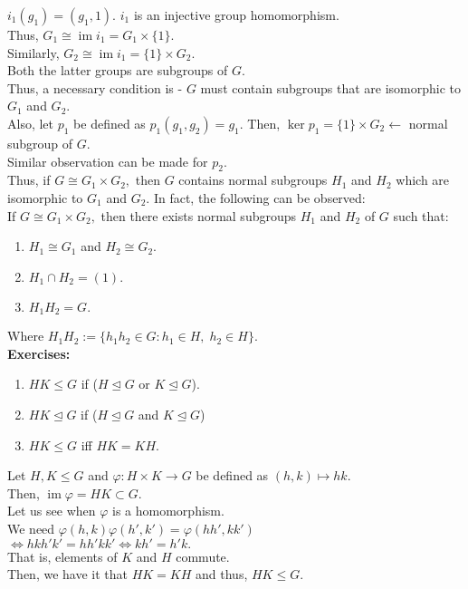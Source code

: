 \documentclass[12 pt, a4paper, toc=graduated, oneside]{article}
\theoremstyle{definition}
\newcommand{\im}{\operatorname{im}}
\begin{document}
$i_1(g_1) = (g_1, 1).$ $i_1$ is an injective group homomorphism.\\
Thus, $G_1 \cong \im i_1 = G_1 \times \{1\}.$\\
Similarly, $G_2 \cong \im i_1 = \{1\} \times G_2.$\\
Both the latter groups are subgroups of $G.$\\
Thus, a necessary condition is - $G$ must contain subgroups that are isomorphic to $G_1$ and $G_2.$\\
Also, let $p_1$	be defined as $p_1(g_1, g_2) = g_1.$ Then, $\ker p_1 = \{1\} \times G_2 \longleftarrow$ normal subgroup of $G.$\\
Similar observation can be made for $p_2.$\\
Thus, if $G \cong G_1 \times G_2,$ then $G$ contains normal subgroups $H_1$ and $H_2$ which are isomorphic to $G_1$ and $G_2.$ In fact, the following can be observed:\\
If $G \cong G_1 \times G_2,$ then there exists normal subgroups $H_1$ and $H_2$ of $G$ such that:
\begin{enumerate}[nosep] 
	\item $H_1 \cong G_1$ and $H_2 \cong G_2.$
	\item $H_1 \cap H_2 = (1).$
	\item $H_1 H_2 = G.$
\end{enumerate}
Where $H_1H_2 := \{h_1h_2 \in G : h_1 \in H, \; h_2 \in H\}.$\\
\textbf{Exercises:}
\begin{enumerate}[nosep] 
	\item $HK \le G$ if ($H\trianglelefteq G$ or $K \trianglelefteq G$).
	\item $HK \trianglelefteq G$ if ($H\trianglelefteq G$ and $K \trianglelefteq G$)
	\item $HK \le G$ iff $HK = KH.$
\end{enumerate}
Let $H, K \le G$ and $\varphi:H\times K \to G$ be defined as $(h, k) \mapsto hk.$\\
Then, $\im \varphi = HK \subset G.$\\
Let us see when $\varphi$ is a homomorphism.\\
We need $\varphi(h, k)\varphi(h', k') = \varphi(hh', kk')$\\
$\iff hkh'k' = hh'kk' \iff kh' = h'k.$\\
That is, elements of $K$ and $H$ commute.\\
Then, we have it that $HK = KH$ and thus, $HK \le G.$\\
\end{document}
